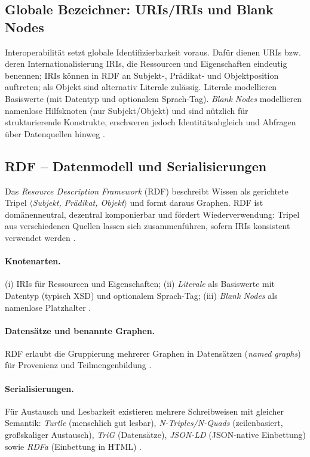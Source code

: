 \subsection{Globale Bezeichner: URIs/IRIs und Blank Nodes}

Interoperabilität setzt globale Identifizierbarkeit voraus. Dafür dienen URIs bzw. deren Internationalisierung IRIs, die Ressourcen und Eigenschaften eindeutig benennen; IRIs können in RDF an Subjekt-, Prädikat- und Objektposition auftreten; als Objekt sind alternativ Literale zulässig. Literale modellieren Basiswerte (mit Datentyp und optionalem Sprach-Tag). \emph{Blank Nodes} modellieren namenlose Hilfsknoten (nur Subjekt/Objekt) und sind nützlich für strukturierende Konstrukte, erschweren jedoch Identitätsabgleich und Abfragen über Datenquellen hinweg \cite{RDF11Primer,Hitzler}.

\subsection{RDF -- Datenmodell und Serialisierungen}
\label{subsec:rdf}

Das \emph{Resource Description Framework} (RDF) beschreibt Wissen als gerichtete Tripel
\(\langle\)\emph{Subjekt, Prädikat, Objekt}\(\rangle\) und formt daraus Graphen. RDF ist domänenneutral, dezentral komponierbar und fördert Wiederverwendung: Tripel aus verschiedenen Quellen lassen sich zusammenführen, sofern IRIs konsistent verwendet werden \cite{RDF11Primer,AntoniouVanHarmelen,Hitzler}.

\paragraph{Knotenarten.} (i) IRIs für Ressourcen und Eigenschaften; (ii) \emph{Literale} als Basiswerte mit Datentyp (typisch XSD) und optionalem Sprach-Tag; (iii) \emph{Blank Nodes} als namenlose Platzhalter \cite{RDF11Primer}.

\paragraph{Datensätze und benannte Graphen.} RDF erlaubt die Gruppierung mehrerer Graphen in Datensätzen (\emph{named graphs}) für Provenienz und Teilmengenbildung \cite{RDF11Primer}.

\paragraph{Serialisierungen.} Für Austausch und Lesbarkeit existieren mehrere Schreibweisen mit gleicher Semantik: \emph{Turtle} (menschlich gut lesbar), \emph{N-Triples/N-Quads} (zeilenbasiert, großskaliger Austausch), \emph{TriG} (Datensätze), \emph{JSON-LD} (JSON-native Einbettung) sowie \emph{RDFa} (Einbettung in HTML) \cite{RDF11Primer}.

